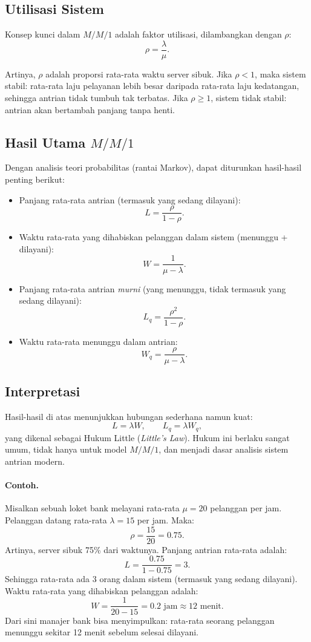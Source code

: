 \documentclass{bukumjh}
\begin{document}
\subsection{Utilisasi Sistem}
Konsep kunci dalam $M/M/1$ adalah {\jsg faktor utilisasi}, dilambangkan dengan $\rho$:
\[
\rho = \frac{\lambda}{\mu}.
\]

Artinya, $\rho$ adalah proporsi rata-rata waktu server sibuk. Jika $\rho < 1$, maka sistem stabil: rata-rata laju pelayanan lebih besar daripada rata-rata laju kedatangan, sehingga antrian tidak tumbuh tak terbatas. Jika $\rho \geq 1$, sistem tidak stabil: antrian akan bertambah panjang tanpa henti.

\subsection{Hasil Utama $M/M/1$}
Dengan analisis teori probabilitas (rantai Markov), dapat diturunkan hasil-hasil penting berikut:
\begin{itemize}
    \item Panjang rata-rata antrian (termasuk yang sedang dilayani):
    \[
    L = \frac{\rho}{1-\rho}.
    \]
    \item Waktu rata-rata yang dihabiskan pelanggan dalam sistem (menunggu + dilayani):
    \[
    W = \frac{1}{\mu - \lambda}.
    \]
    \item Panjang rata-rata antrian \textit{murni} (yang menunggu, tidak termasuk yang sedang dilayani):
    \[
    L_q = \frac{\rho^2}{1-\rho}.
    \]
    \item Waktu rata-rata menunggu dalam antrian:
    \[
    W_q = \frac{\rho}{\mu - \lambda}.
    \]
\end{itemize}

\subsection{Interpretasi}
Hasil-hasil di atas menunjukkan hubungan sederhana namun kuat:
\[
L = \lambda W, \qquad L_q = \lambda W_q,
\]
yang dikenal sebagai {\jsg Hukum Little} (\textit{Little’s Law}). Hukum ini berlaku sangat umum, tidak hanya untuk model $M/M/1$, dan menjadi dasar analisis sistem antrian modern.

\paragraph{Contoh.}  
Misalkan sebuah loket bank melayani rata-rata $\mu=20$ pelanggan per jam. Pelanggan datang rata-rata $\lambda=15$ per jam. Maka:
\[
\rho = \frac{15}{20} = 0.75.
\]
Artinya, server sibuk 75\% dari waktunya. Panjang antrian rata-rata adalah:
\[
L = \frac{0.75}{1-0.75} = 3.
\]
Sehingga rata-rata ada 3 orang dalam sistem (termasuk yang sedang dilayani). Waktu rata-rata yang dihabiskan pelanggan adalah:
\[
W = \frac{1}{20-15} = 0.2 \text{ jam} \approx 12 \text{ menit}.
\]
Dari sini manajer bank bisa menyimpulkan: rata-rata seorang pelanggan menunggu sekitar 12 menit sebelum selesai dilayani.
\end{document}
